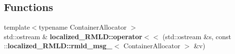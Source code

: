 \subsection*{Functions}
\begin{DoxyCompactItemize}
\item 
{\footnotesize template$<$typename ContainerAllocator $>$ }\\std::ostream \& {\bf localized\_\-RMLD::operator$<$$<$} (std::ostream \&s, const ::{\bf localized\_\-RMLD::rmld\_\-msg\_\-}$<$ ContainerAllocator $>$ \&v)
\end{DoxyCompactItemize}
